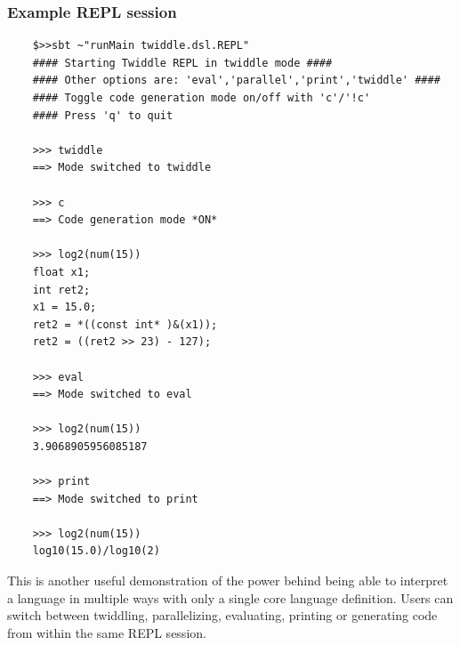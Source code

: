 \documentclass{article}
\begin{document}
\subsubsection{Example REPL session}
\begin{verbatim}
	$>>sbt ~"runMain twiddle.dsl.REPL"
	#### Starting Twiddle REPL in twiddle mode ####
	#### Other options are: 'eval','parallel','print','twiddle' ####
	#### Toggle code generation mode on/off with 'c'/'!c'
	#### Press 'q' to quit

	>>> twiddle
	==> Mode switched to twiddle

	>>> c
	==> Code generation mode *ON*

	>>> log2(num(15))
	float x1;
	int ret2;
	x1 = 15.0;
	ret2 = *((const int* )&(x1));
	ret2 = ((ret2 >> 23) - 127);

	>>> eval
	==> Mode switched to eval

	>>> log2(num(15))
	3.9068905956085187

	>>> print
	==> Mode switched to print

	>>> log2(num(15))
	log10(15.0)/log10(2)
\end{verbatim}

This is another useful demonstration of the power behind being able to interpret a language in multiple ways with only a single core language definition.
Users can switch between twiddling, parallelizing, evaluating, printing or generating code from within the same REPL session.
\end{document}
